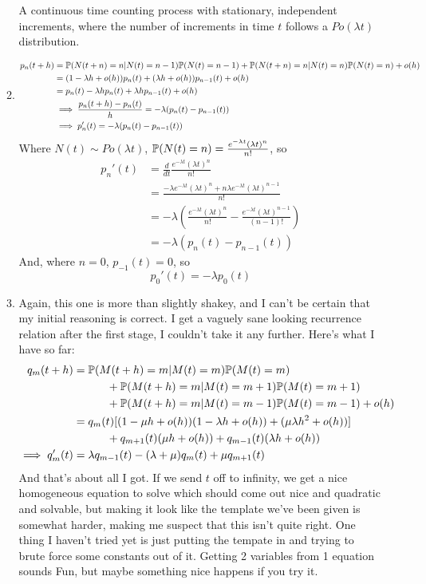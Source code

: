 \documentclass{article}
\begin{document}
\begin{enumerate}
\begin{enumerate}
A continuous time counting process with stationary, independent increments,
where the number of increments in time $t$ follows a $Po(\lambda t)$
distribution.
\item
\begin{align*}
p_n(t+h) &= \mathbb{P}(N(t+n)=n | N(t) = n-1)\mathbb{P}(N(t)=n-1) + \mathbb{P}(N(t+n)=n | N(t) =
n)\mathbb{P}(N(t)=n) + o(h) \\
&= (1-\lambda h +o(h))p_n(t) + (\lambda h + o(h))p_{n-1}(t) + o(h)\\
&= p_n(t) -\lambda h p_n(t) + \lambda h p_{n-1}(t) + o(h)\\
&\implies \frac{p_n(t+h)-p_n(t)}{h} = -\lambda(p_n(t)-p_{n-1}(t))\\
&\implies p_n'(t) = -\lambda(p_n(t)-p_{n-1}(t))
\end{align*}
Where $N(t) \sim Po(\lambda t)$, $\mathbb{P}(N(t)=n) = \frac{e^{-\lambda t}(\lambda 
t)^n}{n!}$, so
\begin{align*}
p_n'(t) &= \frac{d}{dt} \frac{e^{-\lambda t}(\lambda t)^n}{n!}\\
&= \frac{-\lambda e^{-\lambda t}(\lambda t)^n + n \lambda e^{-\lambda t}(\lambda t)^{n-1}}{n!}\\
&= -\lambda \left( \frac{e^{-\lambda t}(\lambda t)^n}{n!} - \frac{e^{-\lambda 
t}(\lambda t)^{n-1}}{(n-1)!}\right)\\
&= -\lambda(p_n(t) - p_{n-1}(t))
\end{align*}
And, where $n=0$, $p_{-1}(t) = 0$, so 
$$
p_0'(t) = -\lambda p_0(t)
$$
\item Again, this one is more than slightly shakey, and I can't be certain that my initial reasoning is correct.  I get a vaguely sane looking recurrence relation after the first stage, I couldn't take it any further. Here's what I have so far:
\begin{align*}
q_m(t+h) &= \mathbb{P}(M(t+h) = m | M(t) = m)\mathbb{P}(M(t)=m)\\
&\quad\quad\quad + \mathbb{P}(M(t+h)=m|M(t) = m+1) \mathbb{P}(M(t) = m+1)\\
&\quad\quad\quad + \mathbb{P}(M(t+h)=m|M(t) = m-1) \mathbb{P}(M(t) = m-1) +o(h)\\
&= q_{m}(t)[(1-\mu h + o(h))(1-\lambda h +o(h)) + (\mu\lambda h^2 +o(h))]\\
&\quad\quad\quad + q_{m+1}(t)(\mu h + o(h)) + q_{m-1}(t)(\lambda h + o(h))\\
\implies q_m'(t)& = \lambda q_{m-1}(t) - (\lambda + \mu) q_m(t) + \mu q_{m+1}(t)
\end{align*}
And that's about all I got. If we send $t$ off to infinity, we get a nice homogeneous equation to solve which should come out nice and quadratic and solvable, but making it look like the template we've been given is somewhat harder, making me suspect that this isn't quite right. One thing I haven't tried yet is just putting the tempate in and trying to brute force some constants out of it. Getting 2 variables from 1 equation sounds Fun, but maybe something nice happens if you try it.

\end{enumerate}
\end{enumerate}
\end{document}

